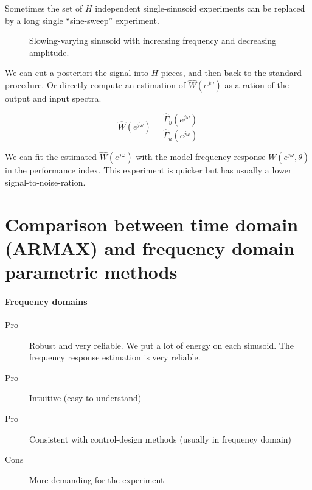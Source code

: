 \begin{remark}
    Sometimes the set of $H$ independent single-sinusoid experiments can be replaced by a long single ``sine-sweep'' experiment.

    \begin{figure}[H]
        \centering
        \caption*{Slowing-varying sinusoid with increasing frequency and decreasing amplitude.}
    \end{figure}

    We can cut a-posteriori the signal into $H$ pieces, and then back to the standard procedure.
    Or directly compute an estimation of $\hat{W}(e^{j\omega})$ as a ration of the output and input spectra.

    \[
        \hat{W}(e^{j\omega}) = \frac{\hat{\Gamma}_y(e^{j\omega})}{\hat{\Gamma}_u(e^{j\omega})}
    \]

    We can fit the estimated $\hat{W}(e^{j\omega})$ with the model frequency response $W(e^{j\omega}, \theta)$ in the performance index.
    This experiment is quicker but has usually a lower signal-to-noise-ration.
\end{remark}

\section{Comparison between time domain (ARMAX) and frequency domain parametric methods}

\paragraph{Frequency domains}
\begin{description}
    \item[Pro] Robust and very reliable. We put a lot of energy on each sinusoid. The frequency response estimation is very reliable.
    \item[Pro] Intuitive (easy to understand)
    \item[Pro] Consistent with control-design methods (usually in frequency domain)
    \item[Cons] More demanding for the experiment
\end{description}

